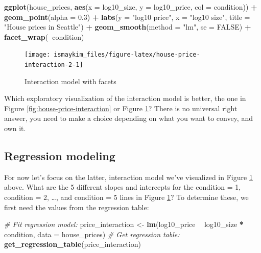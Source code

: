 \documentclass[12pt,]{krantz}
\makeatletter
\newenvironment{Shaded}{\begin{snugshade}}{\end{snugshade}}
\newcommand{\KeywordTok}[1]{\textcolor[rgb]{0.27,0.27,0.27}{\textbf{#1}}}
\newcommand{\DataTypeTok}[1]{\textcolor[rgb]{0.27,0.27,0.27}{#1}}
\newcommand{\FloatTok}[1]{\textcolor[rgb]{0.06,0.06,0.06}{#1}}
\newcommand{\StringTok}[1]{\textcolor[rgb]{0.5,0.5,0.5}{#1}}
\newcommand{\CommentTok}[1]{\textcolor[rgb]{0.37,0.37,0.37}{\textit{#1}}}
\newcommand{\OtherTok}[1]{\textcolor[rgb]{0.37,0.37,0.37}{#1}}
\newcommand{\OperatorTok}[1]{\textcolor[rgb]{0.43,0.43,0.43}{\textbf{#1}}}
\newcommand{\NormalTok}[1]{#1}
\newenvironment{kframe}{%
\medskip{}
\setlength{\fboxsep}{.8em}
 \def\at@end@of@kframe{}%
 \ifinner\ifhmode%
  \def\at@end@of@kframe{\end{minipage}}%
  \begin{minipage}{\columnwidth}%
 \fi\fi%
 \def\FrameCommand##1{\hskip\@totalleftmargin \hskip-\fboxsep
 \colorbox{shadecolor}{##1}\hskip-\fboxsep
     \hskip-\linewidth \hskip-\@totalleftmargin \hskip\columnwidth}%
 \MakeFramed {\advance\hsize-\width
   \@totalleftmargin\z@ \linewidth\hsize
   \@setminipage}}%
 {\par\unskip\endMakeFramed%
 \at@end@of@kframe}
\renewenvironment{Shaded}{\begin{kframe}}{\end{kframe}}
\makeatother
\begin{document}
\begin{Shaded}
\begin{Highlighting}[]
\KeywordTok{ggplot}\NormalTok{(house_prices, }\KeywordTok{aes}\NormalTok{(}\DataTypeTok{x =}\NormalTok{ log10_size, }\DataTypeTok{y =}\NormalTok{ log10_price, }\DataTypeTok{col =}\NormalTok{ condition)) }\OperatorTok{+}
\StringTok{  }\KeywordTok{geom_point}\NormalTok{(}\DataTypeTok{alpha =} \FloatTok{0.3}\NormalTok{) }\OperatorTok{+}
\StringTok{  }\KeywordTok{labs}\NormalTok{(}\DataTypeTok{y =} \StringTok{"log10 price"}\NormalTok{, }\DataTypeTok{x =} \StringTok{"log10 size"}\NormalTok{, }\DataTypeTok{title =} \StringTok{"House prices in Seattle"}\NormalTok{) }\OperatorTok{+}
\StringTok{  }\KeywordTok{geom_smooth}\NormalTok{(}\DataTypeTok{method =} \StringTok{"lm"}\NormalTok{, }\DataTypeTok{se =} \OtherTok{FALSE}\NormalTok{) }\OperatorTok{+}
\StringTok{  }\KeywordTok{facet_wrap}\NormalTok{(}\OperatorTok{~}\NormalTok{condition)}
\end{Highlighting}
\end{Shaded}

\begin{figure}

{\centering \texttt{[image: ismaykim\_files/figure-latex/house-price-interaction-2-1]} 

}

\caption{Interaction model with facets}\label{fig:house-price-interaction-2}
\end{figure}

Which exploratory visualization of the interaction model is better, the
one in Figure \ref{fig:house-price-interaction} or Figure
\ref{fig:house-price-interaction-2}? There is no universal right answer,
you need to make a choice depending on what you want to convey, and own
it.

\subsection{Regression modeling}\label{house-prices-regression}

For now let's focus on the latter, interaction model we've visualized in
Figure \ref{fig:house-price-interaction-2} above. What are the 5
different slopes and intercepts for the condition = 1, condition = 2,
\ldots{}, and condition = 5 lines in Figure
\ref{fig:house-price-interaction-2}? To determine these, we first need
the values from the regression table:

\begin{Shaded}
\begin{Highlighting}[]
\CommentTok{# Fit regression model:}
\NormalTok{price_interaction <-}\StringTok{ }\KeywordTok{lm}\NormalTok{(log10_price }\OperatorTok{~}\StringTok{ }\NormalTok{log10_size }\OperatorTok{*}\StringTok{ }\NormalTok{condition, }\DataTypeTok{data =}\NormalTok{ house_prices)}
\CommentTok{# Get regression table:}
\KeywordTok{get_regression_table}\NormalTok{(price_interaction)}
\end{Highlighting}
\end{Shaded}
\end{document}
